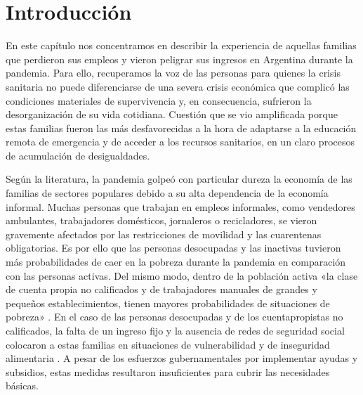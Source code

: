 
\begin{refsection}

\label{cap-25}


\section[Introducción]{Introducción}
\label{cap-25.introduccion}
En este capítulo nos concentramos en describir la experiencia de aquellas familias que perdieron sus empleos y vieron peligrar sus ingresos en Argentina durante la pandemia. Para ello, recuperamos la voz de las personas para quienes la crisis sanitaria no puede diferenciarse de una severa crisis económica que complicó las condiciones materiales de supervivencia y, en consecuencia, sufrieron la desorganización de su vida cotidiana. Cuestión que se vio amplificada porque estas familias fueron las más desfavorecidas a la hora de adaptarse a la educación remota de emergencia y de acceder a los recursos sanitarios, en un claro procesos de acumulación de desigualdades.

Según la literatura, la pandemia golpeó con particular dureza la economía de las familias de sectores populares debido a su alta dependencia de la economía informal. Muchas personas que trabajan en empleos informales, como vendedores ambulantes, trabajadores domésticos, jornaleros o recicladores, se vieron gravemente afectados por las restricciones de movilidad y las cuarentenas obligatorias. Es por ello que las personas desocupadas y las inactivas tuvieron más probabilidades de caer en la pobreza durante la pandemia en comparación con las personas activas. Del mismo modo, dentro de la población activa «la clase de cuenta propia no calificados y de trabajadores manuales de grandes y pequeños establecimientos, tienen mayores probabilidades de situaciones de pobreza» \protect\parencite[pág.~91]{4246-CHAVEZMOLINA2022}. En el caso de las personas desocupadas y de los cuentapropistas no calificados, la falta de un ingreso fijo y la ausencia de redes de seguridad social colocaron a estas familias en situaciones de vulnerabilidad \protect\parencite{4255-SAUTU2022} y de inseguridad alimentaria \protect\parencite{4254-ORTALE2022}. A pesar de los esfuerzos gubernamentales por implementar ayudas y subsidios, estas medidas resultaron insuficientes para cubrir las necesidades básicas.



\end{refsection}
